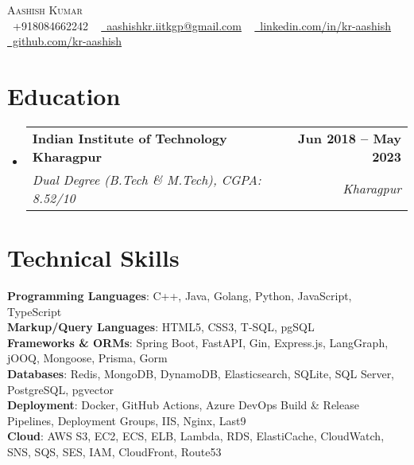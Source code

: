 \documentclass[letterpaper,11pt]{article}
\makeatletter
\newcommand{\resumeSubheading}[4]{
  \vspace{-2pt}\item
    \begin{tabular*}{1.0\textwidth}[t]{l@{\extracolsep{\fill}}r}
      \textbf{#1} & \textbf{\small #2} \\
      \textit{\small#3} & \textit{\small #4} \\
    \end{tabular*}\vspace{-7pt}
}
\newcommand{\resumeSubHeadingListStart}{\begin{itemize}[leftmargin=0.0in, label={}]}
\newcommand{\resumeSubHeadingListEnd}{\end{itemize}}
\makeatother
\begin{document}
\begin{center}
    {\Huge \scshape Aashish Kumar} \\ \vspace{2pt}
    \small \raisebox{-0.1\height}\faPhone\ +918084662242 ~ \href{mailto:aashishkr.iitkgp@gmail.com}{\raisebox{-0.2\height}\faEnvelope\  aashishkr.iitkgp@gmail.com} ~ 
    \href{https://www.linkedin.com/in/kr-aashish/}{\raisebox{-0.2\height}\faLinkedin\ linkedin.com/in/kr-aashish}  ~
    \href{https://github.com/kr-aashish}{\raisebox{-0.2\height}\faGithub\ github.com/kr-aashish}
    \vspace{-8pt}
\end{center}


\section{Education}
  \resumeSubHeadingListStart
    \resumeSubheading
      {Indian Institute of Technology Kharagpur}{Jun 2018 -- May 2023}
      {Dual Degree (B.Tech \& M.Tech), CGPA: 8.52/10}{Kharagpur}
  \resumeSubHeadingListEnd


\section{Technical Skills}
\begin{flushleft}
\setlength{\leftskip}{0.2in}
\small
\textbf{Programming Languages}{: C++, Java, Golang, Python, JavaScript, TypeScript} \\
\vspace{1pt}
\textbf{Markup/Query Languages}{: HTML5, CSS3, T‐SQL, pgSQL} \\
\vspace{1pt}
\textbf{Frameworks \& ORMs}{: Spring Boot, FastAPI, Gin, Express.js, LangGraph, jOOQ, Mongoose, Prisma, Gorm} \\
\vspace{1pt}
\textbf{Databases}{: Redis, MongoDB, DynamoDB, Elasticsearch, SQLite, SQL Server, PostgreSQL, pgvector} \\
\vspace{1pt}
\textbf{Deployment}{: Docker, GitHub Actions, Azure DevOps Build \& Release Pipelines, Deployment Groups, IIS, Nginx, Last9} \\
\vspace{1pt}
\textbf{Cloud}{: AWS S3, EC2, ECS, ELB, Lambda, RDS, ElastiCache, CloudWatch, SNS, SQS, SES, IAM, CloudFront, Route53 }
\end{flushleft}
 \vspace{-16pt}
\end{document}
